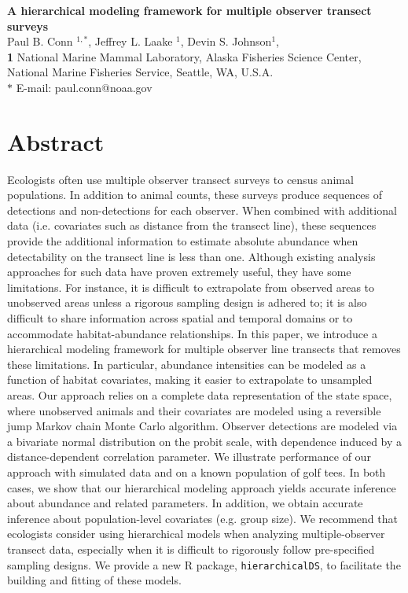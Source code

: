 \documentclass[10pt]{article}
\date{}
\begin{document}
\begin{flushleft}
{\Large
\textbf{A hierarchical modeling framework for multiple observer transect surveys} }
\\
Paul B. Conn $^{1,\ast}$,
Jeffrey L. Laake $^{1}$,
Devin S. Johnson$^{1}$,
\\
{\bf{1}} National Marine Mammal Laboratory, Alaska Fisheries Science Center, National Marine Fisheries Service, Seattle, WA, U.S.A.
\\
$\ast$ E-mail: paul.conn@noaa.gov
\end{flushleft}

\section*{Abstract}
Ecologists often use multiple observer transect surveys to census animal populations.  In addition to animal counts, these surveys produce sequences of detections and non-detections for each observer.  When combined with additional data (i.e. covariates such as distance from the transect line), these sequences provide the additional information to estimate absolute abundance when detectability on the transect line is less than one.  Although existing analysis approaches for such data have proven extremely useful, they have some limitations.  For instance, it is difficult to extrapolate from observed areas to unobserved areas unless a rigorous sampling design is adhered to; it is also difficult to share information across spatial and temporal domains or to accommodate habitat-abundance relationships.  In this paper, we introduce a hierarchical modeling framework for multiple observer line transects that removes these limitations.  In particular, abundance intensities can be modeled as a function of habitat covariates, making it easier to extrapolate to unsampled areas.  Our approach relies on a complete data representation of the state space, where unobserved animals and their covariates are modeled using a reversible jump Markov chain Monte Carlo algorithm.  Observer detections are modeled via a bivariate normal distribution on the probit scale, with dependence induced by a distance-dependent correlation parameter.  We illustrate performance of our approach with simulated data and on a known population of golf tees.  In both cases, we show that our hierarchical modeling approach yields accurate inference about abundance and related parameters.  In addition, we obtain accurate inference about population-level covariates (e.g. group size).  We recommend that ecologists consider using hierarchical models when analyzing multiple-observer transect data, especially when it is difficult to rigorously follow pre-specified sampling designs.  We provide a new R package, {\tt hierarchicalDS}, to facilitate the building and fitting of these models.
\end{document}
